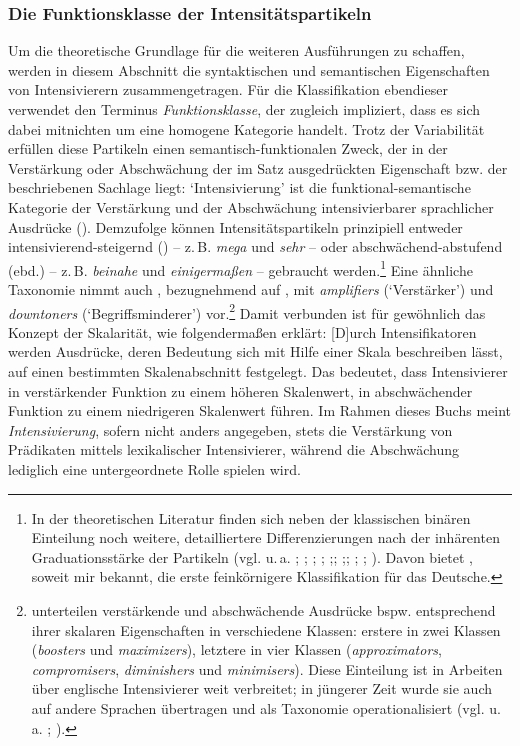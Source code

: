 \subsubsection{Die Funktionsklasse der Intensitätspartikeln}  \label{Funktionsklasse}
Um die theoretische Grundlage für die weiteren Ausführungen zu schaffen, werden in diesem Abschnitt die syntaktischen und semantischen Eigenschaften von Intensivierern zusammengetragen. Für die Klassifikation ebendieser verwendet \citet[83]{Os.1989} den Terminus \textit{Funktionsklasse}, der zugleich impliziert, dass es sich dabei mitnichten um eine homogene Kategorie handelt. Trotz der Variabilität erfüllen diese Partikeln einen semantisch-funktionalen Zweck, der in der Verstärkung oder Abschwächung der im Satz ausgedrückten Eigenschaft bzw. der beschriebenen Sachlage liegt: \glqq{}`Intensivierung’ ist die funktional-semantische Kategorie der Verstärkung und der Abschwächung intensivierbarer sprachlicher Ausdrücke\grqq{} ({\citealt[2]{Os.1989}}). Demzufolge können Intensitätspartikeln prinzipiell entweder
\glqq{}intensivierend-steigernd\grqq{} ({\citealt[56]{Zifonun.1997}}) -- z.\,B. \textit{mega} und \textit{sehr} -- oder \glqq{}abschwächend-abstufend\grqq{} (ebd.) -- z.\,B. \textit{beinahe} und \textit{einigermaßen} -- gebraucht werden.\footnote{In der theoretischen Literatur finden sich neben der klassischen binären Einteilung noch weitere, detailliertere Differenzierungen nach der inhärenten Graduationsstärke der Partikeln (vgl. u.\,a. \citealt[129]{Stoffel.1901}; \citealt[]{Borst.1902}; \citealt[87]{Biedermann.1969}; \citealt[17]{Bolinger.1972}; \citealt[589ff.]{Quirk.1985};; \citealt[19ff.]{Allerton.1987};; \citealt[99]{Os.1989}; \citealt[27]{Paradis.1997}; \citealt[408]{Breindl.2007}). Davon bietet \citet[]{Biedermann.1969}, soweit mir bekannt, die erste feinkörnigere Klassifikation für das Deutsche.} Eine ähnliche Taxonomie nimmt auch {\citet[188f.]{Stratton.2020b}}, bezugnehmend auf \citet[589ff.]{Quirk.1985}, mit \textit{amplifiers} (`Verstärker') und \textit{downtoners} (`Begriffsminderer') vor.\footnote{\citet[589ff.]{Quirk.1985} unterteilen verstärkende und abschwächende Ausdrücke bspw. entsprechend ihrer skalaren Eigenschaften in verschiedene Klassen: erstere in zwei Klassen (\textit{boosters} und \textit{maximizers}), letztere in vier Klassen (\textit{approximators}, \textit{compromisers}, \textit{diminishers} und \textit{minimisers}). Diese Einteilung ist in Arbeiten über englische Intensivierer weit verbreitet; in jüngerer Zeit wurde sie auch auf andere Sprachen übertragen und als Taxonomie operationalisiert (vgl. u.\,a. \citealt[]{Stratton.2020b}; \citealt[]{Stratton.2022}).} Damit verbunden ist für gewöhnlich das Konzept der Skalarität, wie \citet[409]{Breindl.2007} folgendermaßen erklärt: \glqq{}[D]urch Intensifikatoren werden Ausdrücke, deren Bedeutung sich mit Hilfe einer Skala beschreiben lässt, auf einen bestimmten Skalenabschnitt festgelegt\grqq{}. Das bedeutet, dass Intensivierer in verstärkender Funktion zu einem höheren Skalenwert, in abschwächender Funktion zu einem niedrigeren Skalenwert führen. Im Rahmen dieses Buchs meint \textit{Intensivierung}, sofern nicht anders angegeben, stets die Verstärkung von Prädikaten mittels lexikalischer Intensivierer, während die Abschwächung lediglich eine untergeordnete Rolle spielen wird.

